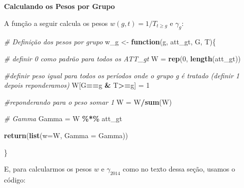 \documentclass[portugues]{article}
\newenvironment{Shaded}{\begin{snugshade}}{\end{snugshade}}
\newcommand{\AttributeTok}[1]{\textcolor[rgb]{0.13,0.29,0.53}{#1}}
\newcommand{\CommentTok}[1]{\textcolor[rgb]{0.56,0.35,0.01}{\textit{#1}}}
\newcommand{\ControlFlowTok}[1]{\textcolor[rgb]{0.13,0.29,0.53}{\textbf{#1}}}
\newcommand{\DecValTok}[1]{\textcolor[rgb]{0.00,0.00,0.81}{#1}}
\newcommand{\FunctionTok}[1]{\textcolor[rgb]{0.13,0.29,0.53}{\textbf{#1}}}
\newcommand{\NormalTok}[1]{#1}
\newcommand{\OtherTok}[1]{\textcolor[rgb]{0.56,0.35,0.01}{#1}}
\newcommand{\SpecialCharTok}[1]{\textcolor[rgb]{0.81,0.36,0.00}{\textbf{#1}}}
\begin{document}
\begin{box_code}

\noindent \textbf{Calculando os Pesos por Grupo}

A função a seguir calcula os pesos $w(g,t) = 1/T_{t \geq g}$ e $\gamma_g$:

\begin{Shaded}
\begin{Highlighting}[]
\CommentTok{\# Definição dos pesos por grupo}
\NormalTok{w\_g }\OtherTok{\textless{}{-}} \ControlFlowTok{function}\NormalTok{(g, att\_gt, G, T)\{}
  
  \CommentTok{\# definir 0 como padrão para todos os ATT\_gt}
\NormalTok{  W }\OtherTok{=} \FunctionTok{rep}\NormalTok{(}\DecValTok{0}\NormalTok{, }\FunctionTok{length}\NormalTok{(att\_gt)) }
  
  \CommentTok{\#definir peso igual para todos os períodos onde o grupo g }
  \CommentTok{é tratado (definir 1 depois reponderamos)}
\NormalTok{  W[G}\SpecialCharTok{==}\NormalTok{g }\SpecialCharTok{\&}\NormalTok{ T}\SpecialCharTok{\textgreater{}=}\NormalTok{g] }\OtherTok{=} \DecValTok{1}
  
  \CommentTok{\#reponderando para o peso somar 1}
\NormalTok{  W }\OtherTok{=}\NormalTok{ W}\SpecialCharTok{/}\FunctionTok{sum}\NormalTok{(W)}
  
  \CommentTok{\# Gamma}
\NormalTok{  Gamma }\OtherTok{=}\NormalTok{ W }\SpecialCharTok{\%*\%}\NormalTok{ att\_gt}
  
  \FunctionTok{return}\NormalTok{(}\FunctionTok{list}\NormalTok{(}\AttributeTok{w=}\NormalTok{W, }\AttributeTok{Gamma =}\NormalTok{ Gamma))}
  
\NormalTok{\}}
\end{Highlighting}
\end{Shaded}

E, para calcularmos os pesos $w$ e $\gamma_{2014}$ como no texto dessa seção, usamos o código:

\begin{Shaded}
\end{Shaded}


\end{box_code}
\end{document}
